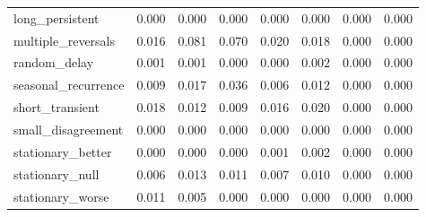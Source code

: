 \begin{tabular}{@{}l r r r r r r r@{}}
long\_persistent & 0.000 & 0.000 & 0.000 & 0.000 & 0.000 & 0.000 & 0.000 \\
multiple\_reversals & 0.016 & 0.081 & 0.070 & 0.020 & 0.018 & 0.000 & 0.000 \\
random\_delay & 0.001 & 0.001 & 0.000 & 0.000 & 0.002 & 0.000 & 0.000 \\
seasonal\_recurrence & 0.009 & 0.017 & 0.036 & 0.006 & 0.012 & 0.000 & 0.000 \\
short\_transient & 0.018 & 0.012 & 0.009 & 0.016 & 0.020 & 0.000 & 0.000 \\
small\_disagreement & 0.000 & 0.000 & 0.000 & 0.000 & 0.000 & 0.000 & 0.000 \\
stationary\_better & 0.000 & 0.000 & 0.000 & 0.001 & 0.002 & 0.000 & 0.000 \\
stationary\_null & 0.006 & 0.013 & 0.011 & 0.007 & 0.010 & 0.000 & 0.000 \\
stationary\_worse & 0.011 & 0.005 & 0.000 & 0.000 & 0.000 & 0.000 & 0.000 \\
\bottomrule
\end{tabular}
